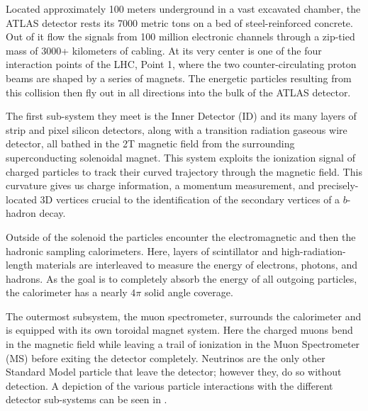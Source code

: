 Located approximately 100 meters underground in a vast excavated chamber, the
ATLAS detector rests its 7000 metric tons on a bed of steel-reinforced
concrete.  Out of it flow the signals from 100 million electronic channels
through a zip-tied mass of 3000+ kilometers of cabling.  At its very center is
one of the four interaction points of the LHC, Point 1, where the
two counter-circulating proton beams are shaped by a
series of magnets.  The energetic particles resulting from this collision then
fly out in all directions into the bulk of the ATLAS detector.

The first sub-system they meet is the Inner Detector (ID) and its many layers
of strip and pixel silicon detectors, along with a transition radiation gaseous
wire detector, all bathed in the 2T magnetic field from the surrounding
superconducting solenoidal magnet.  This system exploits the ionization signal
of charged particles to track their curved trajectory through the magnetic
field.  This curvature gives us charge information, a momentum measurement, and
precisely-located 3D vertices crucial to the identification of the secondary
vertices of a $b$-hadron decay. 

Outside of the solenoid the particles encounter the electromagnetic and then
the hadronic sampling calorimeters. Here, layers of scintillator and
high-radiation-length materials are interleaved to measure the energy of
electrons, photons, and hadrons. As the goal is to completely absorb the energy
of all outgoing particles, the calorimeter has a nearly $4\pi$ solid angle
coverage.

The outermost subsystem, the muon spectrometer, surrounds the calorimeter and
is equipped with its own toroidal magnet system.  Here the charged muons bend
in the magnetic field while leaving a trail of ionization in the Muon
Spectrometer (MS) before exiting the detector completely.  Neutrinos are the
only other Standard Model particle that leave the detector; however they, do so
without detection.  A depiction of the various particle interactions with the
different detector sub-systems can be seen in .


